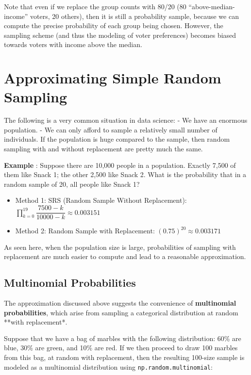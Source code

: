 \documentclass[
  letterpaper,
  DIV=11,
  numbers=noendperiod]{scrreprt}
\providecommand{\tightlist}{%
  \setlength{\itemsep}{0pt}\setlength{\parskip}{0pt}}\usepackage{longtable,booktabs,array}
\begin{document}
Note that even if we replace the group counts with 80/20 (80
``above-median-income'' voters, 20 others), then it is still a
probability sample, because we can compute the precise probability of
each group being chosen. However, the sampling scheme (and thus the
modeling of voter preferences) becomes biased towards voters with income
above the median.

\hypertarget{approximating-simple-random-sampling}{%
\section{Approximating Simple Random
Sampling}\label{approximating-simple-random-sampling}}

The following is a very common situation in data science: - We have an
enormous population. - We can only afford to sample a relatively small
number of individuals. If the population is huge compared to the sample,
then random sampling with and without replacement are pretty much the
same.

\textbf{Example} : Suppose there are 10,000 people in a population.
Exactly 7,500 of them like Snack 1; the other 2,500 like Snack 2. What
is the probability that in a random sample of 20, all people like Snack
1?

\begin{itemize}
\tightlist
\item
  Method 1: SRS (Random Sample Without Replacement):
  \(\prod\limits_{k=0}^{19} \dfrac{7500 - k}{10000 - k} \approx 0.003151\)
\item
  Method 2: Random Sample with Replacement:
  \((0.75)^{20} \approx 0.003171\)
\end{itemize}

As seen here, when the population size is large, probabilities of
sampling with replacement are much easier to compute and lead to a
reasonable approximation.

\hypertarget{multinomial-probabilities}{%
\subsection{Multinomial Probabilities}\label{multinomial-probabilities}}

The approximation discussed above suggests the convenience of
\textbf{multinomial probabilities}, which arise from sampling a
categorical distribution at random **with replacement*.

Suppose that we have a bag of marbles with the following distribution:
60\% are blue, 30\% are green, and 10\% are red. If we then proceed to
draw 100 marbles from this bag, at random with replacement, then the
resulting 100-size sample is modeled as a multinomial distribution using
\texttt{np.random.multinomial}:
\end{document}
